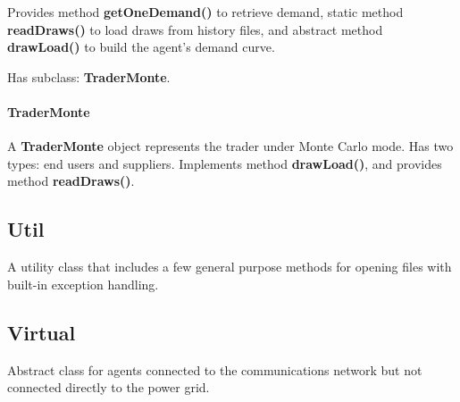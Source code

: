 \documentclass[12pt]{article}
\begin{document}
Provides method \textbf{getOneDemand()} to retrieve demand, static method 
\textbf{readDraws()} to load draws from history files, and abstract method 
\textbf{drawLoad()} to build the agent's demand curve.

Has subclass: \textbf{TraderMonte}.

\paragraph{TraderMonte} \mbox{}

A \textbf{TraderMonte} object represents the trader under Monte Carlo mode. 
Has two types: end users and suppliers. Implements method \textbf{drawLoad()}, 
and provides method \textbf{readDraws()}.

\subsection{Util} \mbox{}
\label{subsec:objects_util}

A utility class that includes a few general purpose methods for opening
files with built-in exception handling.

\subsection{Virtual} \mbox{}
\label{subsec:obejcts_virtual}

Abstract class for agents connected to the communications network but not
connected directly to the power grid.  
\end{document}
